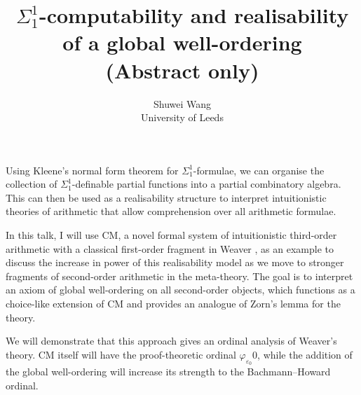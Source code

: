 \documentclass[11pt]{article}
\title{$\Sigma^1_1$-computability and realisability of a global well-ordering \\[6pt] \normalsize (Abstract only)}
\author{Shuwei Wang \\[2pt] \small University of Leeds}
\date{\DTMdate{2024-07-04}}
\begin{document}
\maketitle

Using Kleene's normal form theorem for $\Sigma^1_1$-formulae, we can organise the collection of $\Sigma^1_1$-definable partial functions into a partial combinatory algebra. This can then be used as a realisability structure to interpret intuitionistic theories of arithmetic that allow comprehension over all arithmetic formulae.

In this talk, I will use $\mathrm{CM}$, a novel formal system of intuitionistic third-order arithmetic with a classical first-order fragment in Weaver \cite{weaver09-cm}, as an example to discuss the increase in power of this realisability model as we move to stronger fragments of second-order arithmetic in the meta-theory. The goal is to interpret an axiom of global well-ordering on all second-order objects, which functions as a choice-like extension of $\mathrm{CM}$ and provides an analogue of Zorn's lemma for the theory.

We will demonstrate that this approach gives an ordinal analysis of Weaver's theory. $\mathrm{CM}$ itself will have the proof-theoretic ordinal $\varphi_{\varepsilon_0}0$, while the addition of the global well-ordering will increase its strength to the Bachmann--Howard ordinal.

\bibmain
\end{document}

